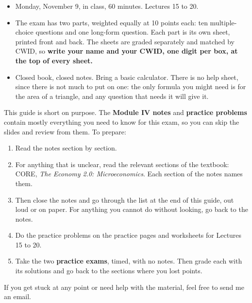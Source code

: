 \documentclass[11pt]{article}
\newcommand{\block}[1]{\needspace{4\baselineskip}\par\vspace{4pt}\noindent{\fontsize{13}{16}\selectfont\bfseries\color{accent}#1}\par\vspace{-5pt}\noindent{\color{accent}\rule{\linewidth}{0.4pt}}\par\vspace{1pt}}
\newcommand{\kw}[1]{\textbf{\textcolor{accent}{#1}}}
\begin{document}
\fontsize{10.5}{13}\selectfont


\block{Exam Logistics}
\begin{itemize}\setlength{\itemsep}{2pt}
\item Monday, November 9, in class, 60 minutes. Lectures 15 to 20.
\item The exam has two parts, weighted equally at 10 points each: ten multiple-choice questions and one long-form question. Each part is its own sheet, printed front and back. The sheets are graded separately and matched by CWID, so \textbf{write your name and your CWID, one digit per box, at the top of every sheet.}
\item Closed book, closed notes. Bring a basic calculator. There is no help sheet, since there is not much to put on one: the only formula you might need is for the area of a triangle, and any question that needs it will give it.
\end{itemize}

\block{How to Prepare?}
This guide is short on purpose. The \kw{Module IV notes} and \kw{practice problems} contain mostly everything you need to know for this exam, so you can skip the slides and review from them. To prepare:
\begin{enumerate}\setlength{\itemsep}{2pt}
\item Read the notes section by section.
\item For anything that is unclear, read the relevant sections of the textbook: CORE, \emph{The Economy 2.0: Microeconomics}. Each section of the notes names them.
\item Then close the notes and go through the list at the end of this guide, out loud or on paper. For anything you cannot do without looking, go back to the notes.
\item Do the practice problems on the practice pages and worksheets for Lectures 15 to 20.
\item Take the two \kw{practice exams}, timed, with no notes. Then grade each with its solutions and go back to the sections where you lost points.
\end{enumerate}
If you get stuck at any point or need help with the material, feel free to send me an email.
\end{document}
